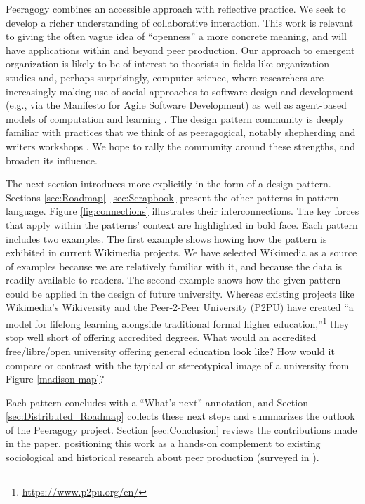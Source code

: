 Peeragogy combines an accessible approach with reflective practice.   We seek to develop a richer understanding of collaborative interaction.  This work is relevant to giving the often vague idea of ``openness'' a more concrete meaning, and will have applications within and beyond peer production.  Our approach to emergent organization is likely to be of interest to theorists in fields like organization studies and, perhaps surprisingly, computer science, where researchers are increasingly making use of social approaches to software design and development (e.g., via the \href{http://www.agilemanifesto.org/}{Manifesto for Agile Software Development}) as well as agent-based models of computation and learning \cite{minsky1967programming,poetry-workshop}.  The design pattern community is deeply familiar with practices that we think of as peeragogical, notably shepherding and writers workshops \cite{gabriel2002writer}.  We hope to rally the community around these strengths, and broaden its influence.

The next section introduces  more explicitly in the form of a design pattern.  Sections \ref{sec:Roadmap}--\ref{sec:Scrapbook} present the other patterns in pattern language.  Figure \ref{fig:connections} illustrates their interconnections.  The key forces that apply within the patterns' context are highlighted in bold face.  Each pattern includes two examples. The first example shows howing how the pattern is exhibited in current Wikimedia projects.  We have selected Wikimedia as a source of examples because we are relatively familiar with it, and because the data is readily available to readers.  The second example shows how the given pattern could be applied in the design of future university.  Whereas existing projects like Wikimedia's Wikiversity and the Peer-2-Peer University (P2PU) have created ``a model for lifelong learning alongside traditional formal higher education,''\footnote{\url{https://www.p2pu.org/en/}} they stop well short of offering accredited degrees.  What would an accredited free/libre/open university offering general education look like?  How would it compare or contrast with the typical or stereotypical image of a university from Figure \ref{madison-map}?

Each pattern concludes with a ``What's next'' annotation, and Section \ref{sec:Distributed_Roadmap} collects these next steps and summarizes the outlook of the Peeragogy project.  Section \ref{sec:Conclusion} reviews the contributions made in the paper, positioning this work as a hands-on complement to existing sociological and historical research about peer production (surveyed in \cite{benkler2015peer}).

